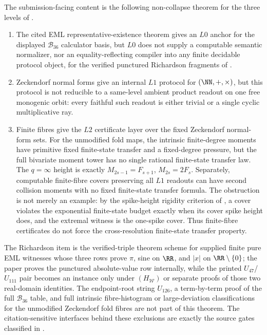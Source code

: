 \begin{theorem}
\label{thm:proc-ams-core-obstruction-spine}
\label{cor:compact-hierarchy-form}
\label{cor:richardson-submission-boundary}
\label{cor:main-L2-addendum}
The submission-facing content is the following non-collapse theorem for the
three levels of .
\begin{enumerate}
\item The cited EML representative-existence theorem gives an \(L0\) anchor for
  the displayed \(\mathcal B_{36}\) calculator basis, but \(L0\) does not supply a
  computable semantic normalizer, nor an equality-reflecting compiler into any
  finite decidable protocol object, for the verified punctured Richardson
  fragments of .
\item Zeckendorf normal forms give an internal \(L1\) protocol for
  \((\NN,+,\times)\), but this protocol is not reducible to a same-level ambient
  product readout on one free monogenic orbit: every faithful such readout is
  either trivial or a single cyclic multiplicative ray.
\item Finite fibres give the \(L2\) certificate layer over the fixed Zeckendorf
  normal-form sets.  For the unmodified fold maps, the intrinsic finite-degree
  moments have primitive fixed finite-state transfer and a fixed-degree pressure,
  but the full bivariate moment tower has no single rational finite-state transfer
  law.  The \(q=\infty\) height is exactly
  \(M_{2s-1}=F_{s+1}\), \(M_{2s}=2F_s\).  Separately, computable finite-fibre
  covers preserving all \(L1\) readouts can have second collision moments with no
  fixed finite-state transfer formula.  The obstruction is not merely an example:
  by the spike-height rigidity criterion of
  , a cover violates the exponential
  finite-state budget exactly when its cover spike height does, and the extremal
  witness is the one-spike cover.
  Thus finite-fibre certificates do not force the cross-resolution finite-state
  transfer property.
\end{enumerate}
The Richardson item is the verified-triple theorem scheme for supplied finite
pure EML witnesses whose three rows prove \(\pi\), sine on \(\RR\), and \(|x|\) on
\(\RR\setminus\{0\}\); the paper proves the punctured absolute-value row
internally, while the printed
\(U_{47}\)/\(U_{111}\) pair becomes an instance only under
\((H_{\mathcal W})\) or separate proofs of those two real-domain identities.
The endpoint-root string \(U_{126}\), a term-by-term proof of the full
\(\mathcal B_{36}\) table, and full intrinsic fibre-histogram or large-deviation
classifications for the unmodified Zeckendorf fold fibres are not part of this
theorem.  The citation-sensitive interfaces behind these exclusions are exactly
the source gates classified in .
\end{theorem}

